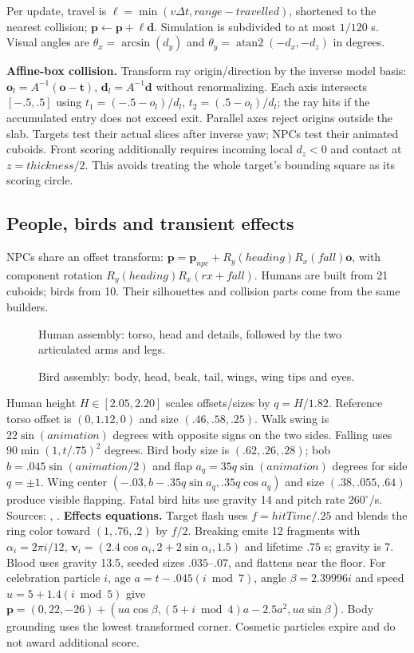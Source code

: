 Per update, travel is $\ell=\min(v\Delta t,range-travelled)$, shortened to the nearest collision; $\mathbf p\leftarrow\mathbf p+\ell\mathbf d$. Simulation is subdivided to at most $1/120$ s. Visual angles are $\theta_x=\arcsin(d_y)$ and $\theta_y=\operatorname{atan2}(-d_x,-d_z)$ in degrees.

\textbf{Affine-box collision.} Transform ray origin/direction by the inverse model basis: $\mathbf o_l=A^{-1}(\mathbf o-\mathbf t)$, $\mathbf d_l=A^{-1}\mathbf d$ without renormalizing. Each axis intersects $[-.5,.5]$ using $t_1=(-.5-o_l)/d_l$, $t_2=(.5-o_l)/d_l$; the ray hits if the accumulated entry does not exceed exit. Parallel axes reject origins outside the slab. Targets test their actual slices after inverse yaw; NPCs test their animated cuboids. Front scoring additionally requires incoming local $d_z<0$ and contact at $z=thickness/2$. This avoids treating the whole target's bounding square as its scoring circle.

\subsection{People, birds and transient effects}
NPCs share an offset transform: $\mathbf p=\mathbf p_{npc}+R_y(heading)R_x(fall)\mathbf o$, with component rotation $R_y(heading)R_x(rx+fall)$. Humans are built from 21 cuboids; birds from 10. Their silhouettes and collision parts come from the same builders.
\begin{figure}[htbp]

\caption{Human assembly: torso, head and details, followed by the two articulated arms and legs.}
\end{figure}
\begin{figure}[htbp]

\caption{Bird assembly: body, head, beak, tail, wings, wing tips and eyes.}
\end{figure}
Human height $H\in[2.05,2.20]$ scales offsets/sizes by $q=H/1.82$. Reference torso offset is $(0,1.12,0)$ and size $(.46,.58,.25)$. Walk swing is $22\sin(animation)$ degrees with opposite signs on the two sides. Falling uses $90\min(1,t/.75)^2$ degrees. Bird body size is $(.62,.26,.28)$; bob $b=.045\sin(animation/2)$ and flap $a_q=35q\sin(animation)$ degrees for side $q=\pm1$. Wing center $(-.03,b-.35q\sin a_q,.35q\cos a_q)$ and size $(.38,.055,.64)$ produce visible flapping. Fatal bird hits use gravity 14 and pitch rate $260^\circ$/s. Sources: , .
\textbf{Effects equations.} Target flash uses $f=hitTime/.25$ and blends the ring color toward $(1,.76,.2)$ by $f/2$. Breaking emits 12 fragments with $\alpha_i=2\pi i/12$, $\mathbf v_i=(2.4\cos\alpha_i,2+2\sin\alpha_i,1.5)$ and lifetime $.75$ s; gravity is 7. Blood uses gravity 13.5, seeded sizes $.035$--$.07$, and flattens near the floor. For celebration particle $i$, age $a=t-.045(i\bmod7)$, angle $\beta=2.39996i$ and speed $u=5+1.4(i\bmod5)$ give $\mathbf p=(0,22,-26)+(ua\cos\beta,(5+i\bmod4)a-2.5a^2,ua\sin\beta)$. Body grounding uses the lowest transformed corner. Cosmetic particles expire and do not award additional score.

